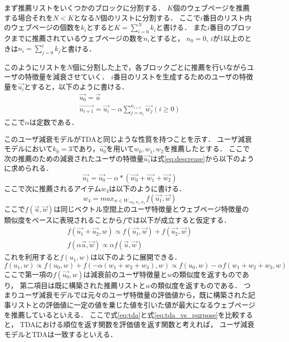 \documentclass[japanese]{jnlp_1.4}
\begin{document}
まず推薦リストをいくつかのブロックに分割する．
$K$個のウェブページを推薦する場合それを$N < K$となる$N$個のリストに分割する．
ここで$i$番目のリスト内のウェブページの個数を$k_i$とすると$K = \sum_{i=0}^N k_i$と書ける．
また$i$番目のブロックまでに推薦されているウェブページの数を$n_i$とすると，
$n_0 = 0$, $i$が1以上のときは$n_i = \sum_{j=0}^{i} k_j$と書ける．

このようにリストを$N$個に分割した上で，各ブロックごとに推薦を行いながらユーザの特徴量を減衰させていく．
$i$番目のリストを生成するためのユーザの特徴量を$\vec{u_i}$とすると，以下のように書ける．
\pagebreak
\begin{gather}
\vec{u_0} = \vec{u} \nonumber \\
\vec{u_{i+1}} = \vec{u_{i}} - \alpha \sum_{j=n_i}^{n_{i+1}} \vec{w_j} (i \geq 0)
\label{eq:descrease}
\end{gather}
ここで$\alpha$は定数である．

このユーザ減衰モデルがTDAと同じような性質を持つことを示す．
ユーザ減衰モデルにおいて$k_0=3$であり，$\vec{u_0}$を用いて$w_0, w_1, w_2$を推薦したとする．
ここで次の推薦のための減衰されたユーザの特徴量$\vec{u_1}$は式\ref{eq:descrease}から以下のように求められる．
\[
\vec{u_1} = \vec{u_0} - \alpha * (\vec{w_0} + \vec{w_1} + \vec{w_2})
\]
ここで次に推薦されるアイテム$w_4$は以下のように書ける．
\[
w_4 = max_{w \in W_{\backslash w_0, w_1, w_2}} f(\vec{u_1}, \vec{w})
\]
ここで$f(\vec{u}, \vec{w})$は同じベクトル空間上のユーザ特徴量とウェブページ特徴量の類似度をベースに表現されることから$f$では以下が成立すると仮定する．
\begin{gather*}
f(\vec{u_1}+\vec{u_2}, w) \propto f(\vec{u_1}, \vec{w}) + f(\vec{u_2}, \vec{w})  \\
f(\alpha \vec{u}, \vec{w}) \propto \alpha f(\vec{u}, \vec{w})
\end{gather*}
これを利用すると$f(u_1, w)$は以下のように展開できる．
\begin{equation}\label{eq:tda_vs_purpose}	
	f(u_1, w) \propto f(u_0, w) + f(- \alpha (w_1+w_2+w_3), w) 
	\propto f(u_0, w) - \alpha f(w_1+w_2+w_3, w)
\end{equation}
ここで第一項の$f(\vec{u_0}, w)$は減衰前のユーザ特徴量と$w$の類似度を返すものであり，
第二項目は既に構築された推薦リストと$w$の類似度を返すものである．
つまりユーザ減衰モデルでは元々のユーザ特徴量の評価値から，既に構築された記事リストとの評価値に一定の値を乗じた値を引いた値が最大になるウェブページを推薦しているといえる．
ここで式\ref{eq:tda}と式\ref{eq:tda_vs_purpose}を比較すると，
TDAにおける順位を返す関数を評価値を返す関数と考えれば，
ユーザ減衰モデルとTDAは一致するといえる．
\end{document}
